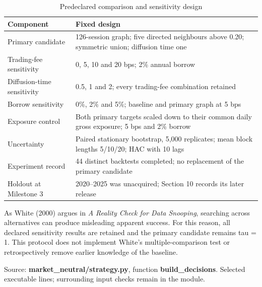 \documentclass[12pt,a4paper,oneside]{article}
\newcommand{\sourcemeta}[1]{\par{\fontsize{9.2}{12}\selectfont #1\par}\vspace{2pt}}
\begin{document}
\begingroup
\setcounter{table}{8}
\fontsize{10}{12.5}\selectfont
\renewcommand{\arraystretch}{1.12}
\begin{table}[!htbp]
\centering
{}\fontsize{10}{12.5}\selectfont
\begin{tabular}{P{0.280000\dimexpr{}\tabcolsep\relax}P{0.720000\dimexpr{}\tabcolsep\relax}}
\toprule
{} \textbf{Component} & \textbf{Fixed design} \\ \midrule
Primary candidate & 126-session graph; five directed neighbours above 0.20; symmetric union; diffusion time one \\
\midrule[0.2pt]
Trading-fee sensitivity & 0, 5, 10 and 20 bps; 2\% annual borrow \\
\midrule[0.2pt]
Diffusion-time sensitivity & 0.5, 1 and 2; every trading-fee combination retained \\
\midrule[0.2pt]
Borrow sensitivity & 0\%, 2\% and 5\%; baseline and primary graph at 5 bps \\
\midrule[0.2pt]
Exposure control & Both primary targets scaled down to their common daily gross exposure; 5 bps and 2\% borrow \\
\midrule[0.2pt]
Uncertainty & Paired stationary bootstrap, 5,000 replicates; mean block lengths 5/10/20; HAC with 10 lags \\
\midrule[0.2pt]
Experiment record & 44 distinct backtests completed; no replacement of the primary candidate \\
\midrule[0.2pt]
Holdout at Milestone 3 & 2020–2025 was unacquired; Section 10 records its later release \\
\bottomrule
\end{tabular}
\caption{Predeclared comparison and sensitivity design}\label{tab:9}
\end{table}
\endgroup

As White (2000) argues in \textit{A Reality Check for Data Snooping}, searching across alternatives can produce misleading apparent success. For this reason, all declared sensitivity results are retained and the primary candidate remains tau = 1. This protocol does not implement White's multiple-comparison test or retrospectively remove earlier knowledge of the baseline.


\sourcemeta{Source: \textbf{market\_neutral/strategy.py}, function \textbf{build\_decisions}. Selected executable lines; surrounding input checks remain in the module.}
\end{document}
